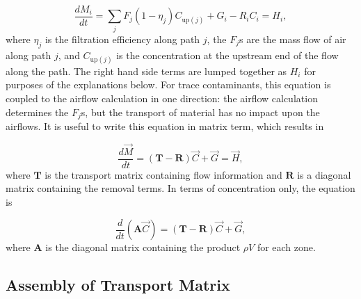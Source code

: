 \documentclass[10pt]{report}
\newcommand{\mat}[1]{\ensuremath{\mathbf{#1}}}
\begin{document}
\begin{equation}
\frac{dM_i}{dt} = \sum_j{F_j (1-\eta_j) C_{\text{up}(j)}} + G_i - R_i C_i = H_i,
\end{equation}
\noindent
where $\eta_j$ is the filtration efficiency along path $j$, the $F_j$s are the mass
flow of air along path $j$, and  $C_{\text{up}(j)}$ is the concentration at the upstream end
of the flow along the path. The right hand side terms are lumped together as
$H_i$ for purposes of the explanations below. For trace contaminants, this
equation is coupled to the airflow calculation in one direction: the airflow
calculation determines the $F_j$s, but the transport of material has no impact
upon the airflows. It is useful to write this equation in matrix term, which results in

\begin{equation}
\frac{d\vec{M}}{dt} = \left(\mat{T} - \mat{R}\right)\vec{C} + \vec{G} = \vec{H},
\end{equation}
\noindent
where $\mat{T}$ is the transport matrix containing flow information and $\mat{R}$
is a diagonal matrix containing the removal terms. In terms of concentration only, the
 equation is

\begin{equation}
\frac{d}{dt}\left(\mat{A}\vec{C}\right) = \left(\mat{T} - \mat{R}\right)\vec{C} + \vec{G},
\end{equation}
\noindent
where $\mat{A}$ is the diagonal matrix containing the product $\rho V$ for each zone. 

\subsection{Assembly of Transport Matrix}
\end{document}
